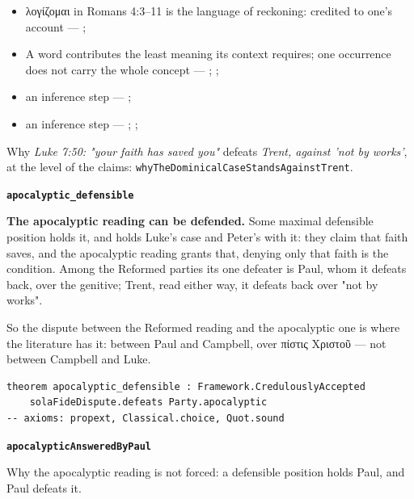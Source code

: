 \documentclass[11pt]{article}
\begin{document}
\begin{itemize}
\begin{itemize}
\item λογίζομαι in Romans 4:3–11 is the language of reckoning: credited to one's account --- \cite[s.v. λογίζομαι]{bauer-danker-lexicon-2000}; \cite[ad loc. Rom 4:3]{moo-romans-1996}
\item A word contributes the least meaning its context requires; one occurrence does not carry the whole concept --- \cite{silva-biblical-words-1994}; \cite{joos-semantic-axiom-1972}; \cite{barr-semantics-2004}
\item an inference step --- \cite[ad loc. Rom 4:6]{moo-romans-1996}; \cite[s.v. λογίζομαι]{bauer-danker-lexicon-2000}
\item an inference step --- \cite{silva-biblical-words-1994}; \cite[p. 80]{moo-romans-1996}; \cite{barr-semantics-2004}
\end{itemize}
\end{itemize}
\noindent Why \emph{Luke 7:50: "your faith has saved you"} defeats \emph{Trent, against 'not by works'}, at the level of the claims: \texttt{why\allowbreak{}The\allowbreak{}Dominical\allowbreak{}Case\allowbreak{}Stands\allowbreak{}Against\allowbreak{}Trent}.
\par\medskip\noindent\textbf{\texttt{apocalyptic\_\allowbreak{}defensible}}\par\nobreak\noindent
\textbf{The apocalyptic reading can be defended.} Some maximal defensible position holds it, and holds Luke's case and Peter's with it: they claim that faith saves, and the apocalyptic reading grants that, denying only that faith is the condition. Among the Reformed parties its one defeater is Paul, whom it defeats back, over the genitive; Trent, read either way, it defeats back over "not by works".

So the dispute between the Reformed reading and the apocalyptic one is where the literature has it: between Paul and Campbell, over πίστις Χριστοῦ — not between Campbell and Luke.

{\small\begin{verbatim}
theorem apocalyptic_defensible : Framework.CredulouslyAccepted
    solaFideDispute.defeats Party.apocalyptic
-- axioms: propext, Classical.choice, Quot.sound
\end{verbatim}}
\par\medskip\noindent\textbf{\texttt{apocalyptic\allowbreak{}Answered\allowbreak{}By\allowbreak{}Paul}}\par\nobreak\noindent
Why the apocalyptic reading is not forced: a defensible position holds Paul, and Paul defeats it.
\end{document}
